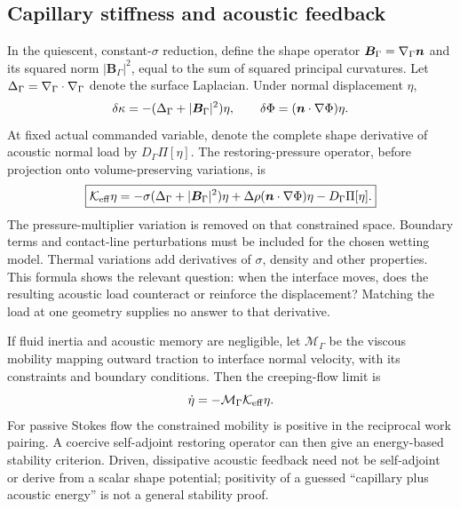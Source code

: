 \subsection{Capillary stiffness and acoustic feedback}
In the quiescent, constant-$\sigma$ reduction, define the shape operator
$\bm B_\Gamma=\nabla_\Gamma\bm n$ and its squared norm $|\bm B_\Gamma|^2$, equal to the sum
of squared principal curvatures. Let $\Delta_\Gamma=\nabla_\Gamma\cdot\nabla_\Gamma$ denote the
surface Laplacian. Under normal displacement $\eta$,
\begin{equation}
 \delta\kappa=-(\Delta_\Gamma+|\bm B_\Gamma|^2)\eta,
 \qquad \delta\Phi=(\bm n\cdot\nabla\Phi)\eta.
 \label{eq:curvature-variation}
\end{equation}
At fixed actual commanded variable, denote the complete shape derivative of
acoustic normal load by $D_\Gamma\Pi[\eta]$. The restoring-pressure operator,
before projection onto volume-preserving variations, is
\begin{equation}
 \boxed{\mathcal K_{\rm eff}\eta
 =-\sigma(\Delta_\Gamma+|\bm B_\Gamma|^2)\eta
    +\Delta\rho(\bm n\cdot\nabla\Phi)\eta
    -D_\Gamma\Pi[\eta].}
 \label{eq:effective-stiffness}
\end{equation}
The pressure-multiplier variation is removed on that constrained space. Boundary
terms and contact-line perturbations must be included for the chosen wetting
model. Thermal variations add derivatives of $\sigma$, density and other
properties. This formula shows the relevant question: when the interface moves,
does the resulting acoustic load counteract or reinforce the displacement?
Matching the load at one geometry supplies no answer to that derivative.

If fluid inertia and acoustic memory are negligible, let $\mathcal M_\Gamma$
be the viscous mobility mapping outward traction to interface normal velocity,
with its constraints and boundary conditions. Then the creeping-flow limit is
\begin{equation}
 \dot\eta=-\mathcal M_\Gamma\mathcal K_{\rm eff}\eta.
 \label{eq:stokes-stability}
\end{equation}
For passive Stokes flow the constrained mobility is positive in the reciprocal
work pairing. A coercive self-adjoint restoring operator can then give an
energy-based stability criterion. Driven, dissipative acoustic feedback need
not be self-adjoint or derive from a scalar shape potential; positivity of a
guessed ``capillary plus acoustic energy'' is not a general stability proof.


